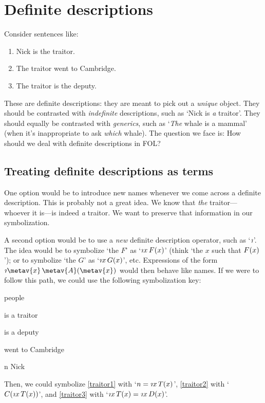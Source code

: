 \chapter{Definite descriptions}\label{subsec.defdesc}
Consider sentences like:
	\begin{enumerate}
		\item\label{traitor1} Nick is the traitor.
		\item\label{traitor2} The traitor went to Cambridge.
		\item\label{traitor3} The traitor is the deputy.
	\end{enumerate}
These are definite descriptions: they are meant to pick out a \emph{unique} object. They should be contrasted with \emph{indefinite} descriptions, such as `Nick  is \emph{a} traitor'. They should equally be contrasted with \emph{generics}, such as `\emph{The} whale is a mammal' (when it's inappropriate to ask \emph{which} whale). The question we face is: How should we deal with definite descriptions in FOL?


\section{Treating definite descriptions as terms}
One option would be to introduce new names whenever we come across a definite description. This is probably not a great idea. We know that \emph{the} traitor---whoever it is---is indeed \emph{a} traitor. We want to preserve that information in our symbolization.

A second option would be to use a \emph{new} definite description operator, such as `$\maththe$'. The idea would be to symbolize `the $F$' as `$\maththe x\,\atom{F}{x}$'  (think `the $x$ such that $F(x)$'); or to symbolize `the $G$' as `$\maththe x\,\atom{G}{x}$', etc. Expressions of the form $\maththe \metav{x}\, \atom{\metav{A}}{\metav{x}}$ would then behave like names. If we were to follow this path, we could use the following symbolization key:
	\begin{ekey}
		\item[\text{domain}] people
		\item[\atom{T}{x}]  is a traitor
		\item[\atom{D}{x}]  is a deputy
		\item[\atom{C}{x}]  went to Cambridge
		\item[n] Nick
	\end{ekey}
Then, we could symbolize \cref{traitor1} with `$n = \maththe x\, \atom{T}{x}$', \cref{traitor2} with `$\atom{C}{\maththe x\,\atom{T}{x}}$', and \cref{traitor3} with `$\maththe x\, \atom{T}{x} = \maththe x\, \atom{D}{x}$'.

